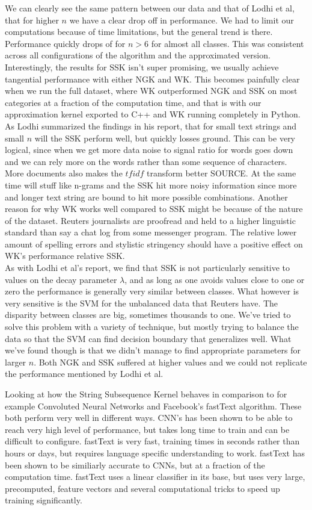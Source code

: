 We can clearly see the same pattern between our data and that of Lodhi et al, that for higher $ n $ we have a clear drop off in performance. We had to limit our computations because of time limitations, but the general trend is there. Performance quickly drops of for $ n>6 $ for almost all classes. This was consistent across all configurations of the algorithm and the approximated version. Interestingly, the results for SSK isn't super promising, we usually achieve tangential performance with either NGK and WK. This becomes painfully clear when we run the full dataset, where WK outperformed NGK and SSK on most categories at a fraction of the computation time, and that is with our approximation kernel exported to C++ and WK running completely in Python. As Lodhi summarized the findings in his report, that for small text strings and small $ n $ will the SSK perform well, but quickly losses ground. This can be very logical, since when we get more data noise to signal ratio for words goes down and we can rely more on the words rather than some sequence of characters. More documents also makes the $ tfidf $ transform better SOURCE. At the same time will stuff like n-grams and the SSK hit more noisy information since more and longer text string are bound to hit more possible combinations. Another reason for why WK works well compared to SSK might be because of the nature of the dataset. Reuters journalists are proofread and held to a higher linguistic standard than say a chat log from some messenger program. The relative lower amount of spelling errors and stylistic stringency should have a positive effect on WK's performance relative SSK.
\\
As with Lodhi et al's report, we find that SSK is not particularly sensitive to values on the decay parameter $ \lambda $, and as long as one avoids values close to one or zero the performance is generally very similar between classes. What however is very sensitive is the SVM for the unbalanced data that Reuters have. The disparity between classes are big, sometimes thousands to one. We've tried to solve this problem with a variety of technique, but mostly trying to balance the data so that the SVM can find decision boundary that generalizes well. What we've found though is that we didn't manage to find appropriate parameters for larger $ n $. Both NGK and SSK suffered at higher values and we could not replicate the performance mentioned by Lodhi et al.  

Looking at how the String Subsequence Kernel behaves in comparison to for example Convoluted Neural Networks and Facebook's fastText algorithm. These both perform very well in different ways. CNN's has been shown to be able to reach very high level of performance, but takes long time to train and can be difficult to configure. fastText is very fast, training times in seconds rather than hours or days, but requires language specific understanding to work. fastText has been shown to be similiarly accurate to CNNs, but at a fraction of the computation time. fastText uses a linear classifier in its base, but uses very large, precomputed, feature vectors and several computational tricks to speed up training significantly.